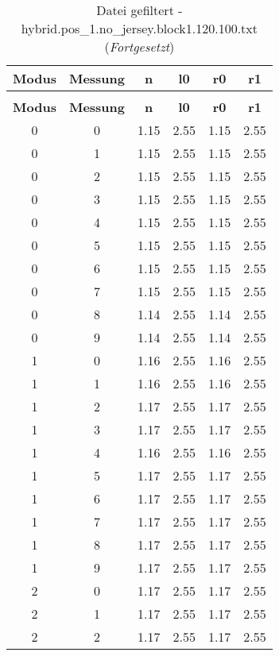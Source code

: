 \begin{longtable}{|c|c||c||c||c|c|}
	\caption{Datei gefiltert - hybrid.pos\_1.no\_jersey.block1.120.100.txt} \label{tab:hybrid.pos-1.no-jersey.block1.120.100.txt} \\ \hline
	\textbf{Modus} & \textbf{Messung} & \textbf{n} & \textbf{l0} & \textbf{r0} & \textbf{r1}\\ \hline
	\endfirsthead
	\caption[]{Datei gefiltert - hybrid.pos\_1.no\_jersey.block1.120.100.txt (\emph{Fortgesetzt})} \\ \hline
	\textbf{Modus} & \textbf{Messung} & \textbf{n} & \textbf{l0} & \textbf{r0} & \textbf{r1}\\ \hline
	\endhead
	0 & 0 & 1.15 & 2.55 & 1.15 & 2.55 \\ \hline
	0 & 1 & 1.15 & 2.55 & 1.15 & 2.55 \\ \hline
	0 & 2 & 1.15 & 2.55 & 1.15 & 2.55 \\ \hline
	0 & 3 & 1.15 & 2.55 & 1.15 & 2.55 \\ \hline
	0 & 4 & 1.15 & 2.55 & 1.15 & 2.55 \\ \hline
	0 & 5 & 1.15 & 2.55 & 1.15 & 2.55 \\ \hline
	0 & 6 & 1.15 & 2.55 & 1.15 & 2.55 \\ \hline
	0 & 7 & 1.15 & 2.55 & 1.15 & 2.55 \\ \hline
	0 & 8 & 1.14 & 2.55 & 1.14 & 2.55 \\ \hline
	0 & 9 & 1.14 & 2.55 & 1.14 & 2.55 \\ \hline
	1 & 0 & 1.16 & 2.55 & 1.16 & 2.55 \\ \hline
	1 & 1 & 1.16 & 2.55 & 1.16 & 2.55 \\ \hline
	1 & 2 & 1.17 & 2.55 & 1.17 & 2.55 \\ \hline
	1 & 3 & 1.17 & 2.55 & 1.17 & 2.55 \\ \hline
	1 & 4 & 1.16 & 2.55 & 1.16 & 2.55 \\ \hline
	1 & 5 & 1.17 & 2.55 & 1.17 & 2.55 \\ \hline
	1 & 6 & 1.17 & 2.55 & 1.17 & 2.55 \\ \hline
	1 & 7 & 1.17 & 2.55 & 1.17 & 2.55 \\ \hline
	1 & 8 & 1.17 & 2.55 & 1.17 & 2.55 \\ \hline
	1 & 9 & 1.17 & 2.55 & 1.17 & 2.55 \\ \hline
	2 & 0 & 1.17 & 2.55 & 1.17 & 2.55 \\ \hline
	2 & 1 & 1.17 & 2.55 & 1.17 & 2.55 \\ \hline
	2 & 2 & 1.17 & 2.55 & 1.17 & 2.55 \\ \hline

\end{longtable}
